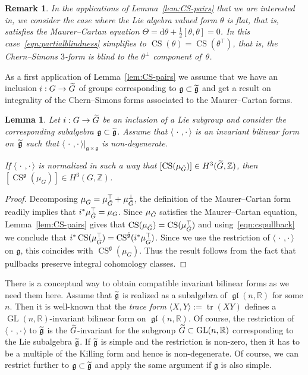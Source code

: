 \documentclass[10pt,a4paper]{amsart}
\newcommand{\x}{\times}
\newcommand{\B}[2]{\langle#1,#2\rangle}
\DeclareMathOperator{\CS}{CS}
\DeclareMathOperator{\GL}{GL}
\DeclareMathOperator{\tr}{tr}
\DeclareMathOperator{\fkgl}{\mathfrak{gl}}
\renewcommand*{\d}{\mathrm{d}}
\newcommand*{\R}{\mathbb{R}}
\newcommand{\Z}{\mathbb{Z}}
\newcommand{\fkg}{\mathfrak{g}}
\renewcommand*{\to}{\mathchoice{\longrightarrow}{\rightarrow}{\rightarrow}{\rightarrow}}
\let\oldtilde\tilde
\renewcommand*{\tilde}[1]{\mathchoice{\widetilde{#1}}{\widetilde{#1}}{\oldtilde{#1}}{\oldtilde{#1}}}
\newtheorem{lemm}[theo]{Lemma}
\newtheorem{rema}[theo]{Remark}
\theoremstyle{definition}\newtheorem{defi}[theo]{Definition}
\begin{document}
\begin{rema}
In the applications of Lemma~\ref{lem:CS-pairs} that we are interested in, we consider the case where the Lie algebra valued form $\theta$ is \emph{flat}, that is, satisfies the Maurer--Cartan equation $\Theta=\d\theta+\frac{1}{2}[\theta,\theta]=0$. In this case~\eqref{eqn:partialblindness} simplifies to $\CS(\theta)=\CS(\theta^{\top})$, that is, the Chern--Simons $3$-form is blind to the $\theta^{\perp}$ component of~$\theta$.
\end{rema}

As a first application of Lemma~\ref{lem:CS-pairs} we assume that we have an inclusion $i: G\to\tilde G$ of groups corresponding to $\fkg\subset\tilde{\fkg}$ and get a result on integrality of the Chern--Simons forms associated to the Maurer--Cartan forms.

\begin{lemm}\label{lem:CS-subgroup}
Let $i: G\to\tilde G$ be an inclusion of a Lie subgroup and consider the corresponding subalgebra $\fkg\subset\tilde{\fkg}$. Assume that $\B{\,\cdot\,}{\cdot\,}$ is an invariant bilinear form on~$\tilde{\fkg}$ such that $\B{\,\cdot\,}{\cdot\,}|_{\fkg\x\fkg}$ is non-degenerate.

If $\B{\,\cdot\,}{\cdot\,}$ is normalized in such a way that $[\CS(\mu_{\tilde G})]\in H^3(\tilde G,\Z)$, then $[\CS^{\fkg}(\mu_G)]\in H^3(G,\Z)$.
\end{lemm}


\begin{proof}
Decomposing $\mu_{\tilde G}=\mu_{\tilde G}^\top+\mu_{\tilde G}^\perp$, the definition of the Maurer--Cartan form readily implies that $i^*\mu_{\tilde G}^\top=\mu_G$. Since $\mu_{\tilde G}$ satisfies the Maurer--Cartan equation, Lemma~\ref{lem:CS-pairs} gives that $\CS(\mu_{\tilde G})=\CS(\mu_{\tilde G}^\top)$ and using~\eqref{eqn:cspullback} we conclude that $i^*\CS(\mu_{\tilde G}^\top)=\CS^{\tilde{\fkg}}(i^*\mu_{\tilde G}^\top)$. Since we use the restriction of $\B{\,\cdot\,}{\cdot\,}$ on $\fkg$, this coincides with $\CS^\fkg(\mu_G)$. Thus the result follows from the fact that pullbacks preserve integral cohomology classes.
\end{proof}

There is a conceptual way to obtain compatible invariant bilinear forms as we need them here. Assume that $\tilde{\fkg}$ is realized as a subalgebra of $\fkgl(n,\R)$ for some $n$. Then it is well-known that the \emph{trace form} $\B{X}{Y}:=\tr(XY)$ defines a $\GL(n,\R)$-invariant bilinear form on $\fkgl(n,\R)$. Of course, the restriction of $\B{\,\cdot\,}{\cdot\,}$ to $\tilde{\fkg}$ is the $\tilde G$-invariant for the subgroup $\tilde G\subset \GL(n,\R)$ corresponding to the Lie subalgebra $\tilde{\fkg}$. If $\tilde{\fkg}$ is simple and the restriction is non-zero, then it has to be a multiple of the Killing form and hence is non-degenerate. Of course, we can restrict further to $\fkg\subset\tilde{\fkg}$ and apply the same argument if $\fkg$ is also simple.
\end{document}
